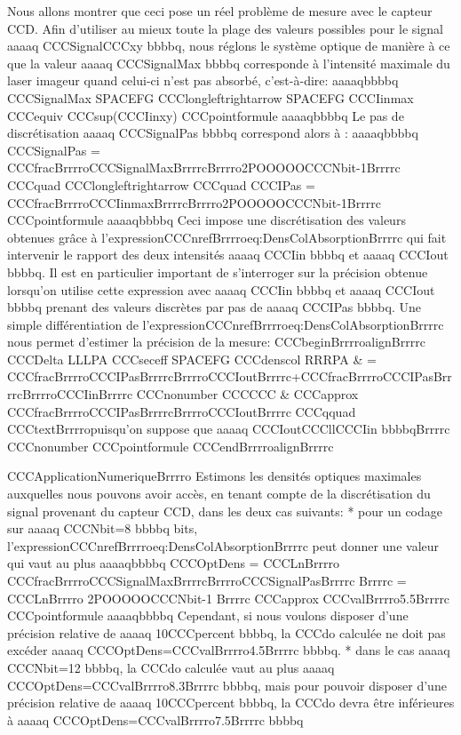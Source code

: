 Nous allons montrer que ceci pose un réel problème de mesure avec le capteur CCD. 
Afin d'utiliser au mieux toute la plage des valeurs possibles pour le signal aaaaq CCCSignalCCCxy bbbbq,
nous réglons le système optique de manière à ce que la valeur aaaaq CCCSignalMax bbbbq corresponde à l'intensité maximale du laser imageur quand celui-ci n'est pas absorbé, c'est-à-dire:
aaaaqbbbbq
CCCSignalMax  SPACEFG  CCClongleftrightarrow  SPACEFG  CCCIinmax CCCequiv CCCsup(CCCIinxy)
CCCpointformule
aaaaqbbbbq 
Le pas de discrétisation aaaaq CCCSignalPas bbbbq correspond alors à :
aaaaqbbbbq
CCCSignalPas = CCCfracBrrrroCCCSignalMaxBrrrrcBrrrro2POOOOOCCCNbit-1Brrrrc 
CCCquad CCClongleftrightarrow CCCquad 
CCCIPas = CCCfracBrrrroCCCIinmaxBrrrrcBrrrro2POOOOOCCCNbit-1Brrrrc
CCCpointformule
aaaaqbbbbq
Ceci impose une discrétisation des valeurs obtenues grâce à l'expressionCCCnrefBrrrroeq:DensColAbsorptionBrrrrc qui fait intervenir le rapport des deux intensités aaaaq CCCIin bbbbq et aaaaq CCCIout bbbbq. 
Il est en particulier important de s'interroger sur la précision obtenue lorsqu'on utilise cette expression avec aaaaq CCCIin bbbbq et aaaaq CCCIout bbbbq prenant des valeurs discrètes par pas de aaaaq CCCIPas bbbbq. Une simple différentiation de l'expressionCCCnrefBrrrroeq:DensColAbsorptionBrrrrc nous permet d'estimer la précision de la mesure:
CCCbeginBrrrroalignBrrrrc
CCCDelta  LLLPA  CCCseceff  SPACEFG  CCCdenscol  RRRPA  & = CCCfracBrrrroCCCIPasBrrrrcBrrrroCCCIoutBrrrrc+CCCfracBrrrroCCCIPasBrrrrcBrrrroCCCIinBrrrrc CCCnonumber CCCCCC
& CCCapprox CCCfracBrrrroCCCIPasBrrrrcBrrrroCCCIoutBrrrrc CCCqquad CCCtextBrrrropuisqu'on suppose que aaaaq CCCIoutCCCllCCCIin bbbbqBrrrrc CCCnonumber
CCCpointformule
CCCendBrrrroalignBrrrrc
 
CCCApplicationNumeriqueBrrrro
Estimons les densités optiques maximales auxquelles nous pouvons avoir accès, en tenant compte de la discrétisation du signal provenant du capteur CCD, dans les deux cas suivants:
	* pour un codage sur aaaaq CCCNbit=8 bbbbq bits, l'expressionCCCnrefBrrrroeq:DensColAbsorptionBrrrrc peut donner une valeur qui vaut au plus
aaaaqbbbbq
	CCCOptDens
	=  
	CCCLnBrrrro
	CCCfracBrrrroCCCSignalMaxBrrrrcBrrrroCCCSignalPasBrrrrc 
	Brrrrc
	= 
	CCCLnBrrrro 2POOOOOCCCNbit-1 Brrrrc 
	CCCapprox CCCvalBrrrro5.5Brrrrc
	CCCpointformule
aaaaqbbbbq
Cependant, si nous voulons disposer d'une précision relative de aaaaq 10CCCpercent bbbbq, la CCCdo calculée ne doit pas excéder aaaaq CCCOptDens=CCCvalBrrrro4.5Brrrrc bbbbq.
* dans le cas aaaaq CCCNbit=12 bbbbq, la CCCdo calculée vaut au plus aaaaq CCCOptDens=CCCvalBrrrro8.3Brrrrc bbbbq, mais pour pouvoir disposer d'une précision relative de aaaaq 10CCCpercent bbbbq, la CCCdo devra être inférieures à aaaaq CCCOptDens=CCCvalBrrrro7.5Brrrrc bbbbq 

